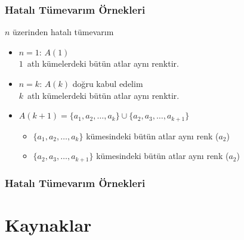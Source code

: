 \documentclass[dvipsnames]{beamer}
\theoremstyle{definition}
\theoremstyle{example}
\theoremstyle{plain}
\begin{document}
\begin{frame}
  \frametitle{Hatalı Tümevarım Örnekleri}

  \begin{block}{$n$ üzerinden hatalı tümevarım}
    \begin{itemize}
      \item $n=1$: $A(1)$\\
        $1$~atlı kümelerdeki bütün atlar aynı renktir.

      \pause
      \medskip
      \item $n=k$: $A(k)$ doğru kabul edelim\\
        $k$~atlı kümelerdeki bütün atlar aynı renktir.

      \pause
      \medskip
      \item $A(k+1)=\{a_1,a_2,\dots,a_k\} \cup \{a_2,a_3,\dots,a_{k+1}\}$
      \begin{itemize}
        \item $\{a_1,a_2,\dots,a_k\}$ kümesindeki bütün atlar aynı renk ($a_2$)
        \item $\{a_2,a_3,\dots,a_{k+1}\}$ kümesindeki bütün atlar aynı renk
          ($a_2$)
      \end{itemize}
    \end{itemize}
  \end{block}
\end{frame}

\begin{frame}
  \frametitle{Hatalı Tümevarım Örnekleri}

  \begin{center}
  \end{center}
\end{frame}

\section*{Kaynaklar}
\end{document}
